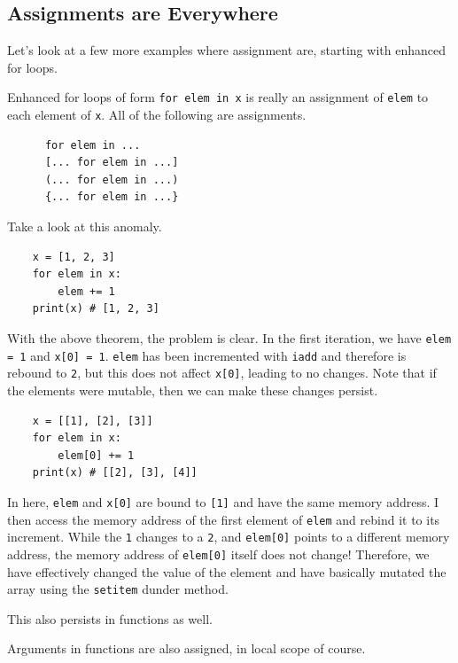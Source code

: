 \subsection{Assignments are Everywhere}

  Let's look at a few more examples where assignment are, starting with enhanced for loops. 

  \begin{theorem}
    \label{thm:assignments-in-enhanced-for-loops}
    Enhanced for loops of form \texttt{for elem in x} is really an assignment of \texttt{elem} to each element of \texttt{x}. All of the following are assignments. 
    \begin{lstlisting}
      for elem in ... 
      [... for elem in ...]
      (... for elem in ...)
      {... for elem in ...}
    \end{lstlisting}
  \end{theorem}

  Take a look at this anomaly. 
  \begin{lstlisting}
    x = [1, 2, 3] 
    for elem in x: 
        elem += 1 
    print(x) # [1, 2, 3]
  \end{lstlisting}
  With the above theorem, the problem is clear. In the first iteration, we have \texttt{elem = 1} and \texttt{x[0] = 1}. \texttt{elem} has been incremented with \texttt{iadd} and therefore is rebound to \texttt{2}, but this does not affect \texttt{x[0]}, leading to no changes. Note that if the elements were mutable, then we can make these changes persist. 
  \begin{lstlisting}
    x = [[1], [2], [3]]
    for elem in x: 
        elem[0] += 1 
    print(x) # [[2], [3], [4]]
  \end{lstlisting}
  In here, \texttt{elem} and \texttt{x[0]} are bound to \texttt{[1]} and have the same memory address. I then access the memory address of the first element of \texttt{elem} and rebind it to its increment. While the \texttt{1} changes to a \texttt{2}, and \texttt{elem[0]} points to a different memory address, the memory address of \texttt{elem[0]} itself does not change! Therefore, we have effectively changed the value of the element and have basically mutated the array using the \texttt{setitem} dunder method. 
  
  This also persists in functions as well. 

  \begin{theorem}
    \label{thm:assignments-in-functions}
    Arguments in functions are also assigned, in local scope of course.  
  \end{theorem}

